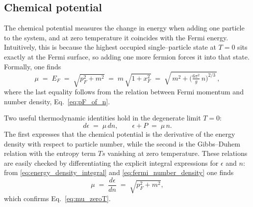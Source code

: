 \subsection*{Chemical potential}
The chemical potential measures the change in energy when adding one particle to the system,
and at zero temperature it coincides with the Fermi energy.
Intuitively, this is because the highest occupied single--particle state at $T=0$ 
sits exactly at the Fermi surface, so adding one more fermion forces it into that state. 
Formally, one finds
\begin{equation}
\mu \;=\; E_F \;=\; \sqrt{p_F^2+m^2}
\;=\; m\,\sqrt{1+x_F^2}
\;=\; \sqrt{\,m^2 + \Big(\tfrac{6\pi^2}{g}\,n\Big)^{2/3}\,},
\label{eq:mu_zeroT}
\end{equation}
where the last equality follows from the relation between Fermi momentum and number density, 
Eq.~\eqref{eq:pF_of_n}.

Two useful thermodynamic identities hold in the degenerate limit $T=0$: 
\begin{equation}
d\epsilon \;=\; \mu\,dn,
\qquad
\epsilon + P \;=\; \mu\,n.
\label{eq:zeroT_identities}
\end{equation}
The first expresses that the chemical potential is the derivative of the energy density 
with respect to particle number, while the second is the Gibbs--Duhem relation
with the entropy term $Ts$ vanishing at zero temperature. 
These relations are easily checked by differentiating the explicit integral expressions 
for $\epsilon$ and $n$: from \eqref{eq:energy_density_integral} and \eqref{eq:fermi_number_density} one finds
\[
\mu \;=\; \frac{d\epsilon}{dn} \;=\; \sqrt{p_F^2+m^2},
\]
which confirms Eq.~\eqref{eq:mu_zeroT}.

